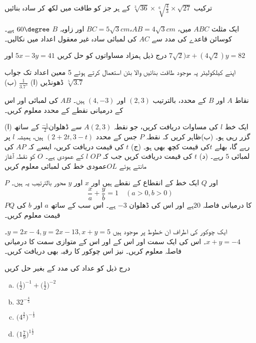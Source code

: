 ترکیب \(\sqrt[3]{36}\times\sqrt[6]{\frac{4}{3}}\times\sqrt{27}\)
 کے ہر جز کو طاقت میں لکھ کر سادہ بنائیں

ایک مثلث \(ABC\) میں، \(AB=4\sqrt{3}cm\)،\(BC=5\sqrt{3}cm\) اور زاویہ \(B\) \(60\degree\) ہے۔ کوسائن قاعدے کی مدد سے \(AC\) کی لمبائی سادہ غیر معقول اعداد میں نکالیں۔

درج ذیل ہمزاد مساواتوں کو حل کریں
\(5x-3y=41\) اور \(7\sqrt{2})x+(4\sqrt{2})y=82\)

اپنے کیلکولیٹر پہ موجود طاقت بنائیں والا بٹن استعمال کرتے ہوئے 5 معین اعداد تک جواب ڈھونڈیں
(ا) 
\(\frac{1}{3.7^{5}}\)
(ب)
 \(\sqrt[5]{3.7}\)

نقاط \(A\) اور \(B\) کے محدد، بالترتیب \((2,3)\) اور
\((4,-3)\) ہیں۔ \(AB\) کی لمبائی اور اس کے درمیانی نقطے کے محدد معلوم کریں۔

(ا) ایک خط \(l\) کی مساوات دریافت کریں، جو نقطہ \(A(2,3)\) سے ڈھلوان\(\frac{-1}{2}\) کے ساتھ گزر رہی ہو۔
(ب)ظاہر کریں کہ نقطہ \(P\) جس کے محدد \((2+2t,3-t)\) ہیں، ہمیشہ \(l\) پر رہے گا، بھلے \(t\)کی قیمت کچھ بھی ہو۔
(ج) \(t\) کی قیمت دریافت کریں، ایسے کہ \(AP\) کی لمبائی \(5\) رہے۔
(د) \(t\) کی قیمت دریافت کریں جب کہ \(OP\) \(l\) کے عمودی ہے۔ \(O\) کو نقطہ آغاز مانتے ہوئے \(OL\)عمودی خط کی لمبائی معلوم کریں



\(P\) اور \(Q\) ایک خط کے انقطاع کے نقطے ہیں
اور \(x\) اور \(y\) محور بالترتیب یہ ہیں۔
\[\frac{x}{a}+\frac{y}{b}=1\quad(a>0,b>0)\]
\(PQ\) کا درمیانی فاصلہ \(20\)ہے اور اس کی ڈھلوان \(-3\) ہے۔ اس سب کے ساتھ \(a\) اور \(b\) کی قیمت معلوم کریں۔

ایک چوکور کی اطراف ان خطوط پر موجود ہیں \(y=2x-4, y=2x-13, x+y=5\)۔\(x+y=-4\)۔
اس کی ایک سمت اور اس کے اور اس کے متوازی سمت کا درمیانی فاصلہ معلوم کریں۔ نیز اس چوکور کا رقبہ بھی دریافت کریں۔

درج ذیل کو عداد کی مدد کے بغیر حل کریں
\begin{multicols}{4}
\begin{enumerate}[a.]
\item
\(\Big(\frac{1}{2}\Big)^{-1}+\Big(\frac{1}{2}\Big)^{-2}\)
\item
\(32^{-\frac{4}{5}}\)
\item
\(\Big(4^{\frac{3}{2}}\Big)^{-\frac{1}{3}}\)
\item
\(\Big(1\frac{7}{9}\Big)^{1\frac{1}{2}}\)
\end{enumerate}
\end{multicols}

